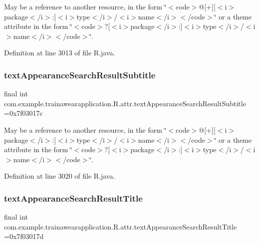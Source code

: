 May be a reference to another resource, in the form \char`\"{}$<$code$>$@\mbox{[}+\mbox{]}\mbox{[}$<$i$>$package$<$/i$>$\+:\mbox{]}$<$i$>$type$<$/i$>$/$<$i$>$name$<$/i$>$$<$/code$>$\char`\"{} or a theme attribute in the form \char`\"{}$<$code$>$?\mbox{[}$<$i$>$package$<$/i$>$\+:\mbox{]}$<$i$>$type$<$/i$>$/$<$i$>$name$<$/i$>$$<$/code$>$\char`\"{}. 

Definition at line 3013 of file R.\+java.

\mbox{\label{classcom_1_1example_1_1trainawearapplication_1_1_r_1_1attr_a7c5f9c532f87a44728789777e362cddf}} 
\subsubsection{\texorpdfstring{textAppearanceSearchResultSubtitle}{textAppearanceSearchResultSubtitle}}
{\footnotesize\ttfamily final int com.\+example.\+trainawearapplication.\+R.\+attr.\+text\+Appearance\+Search\+Result\+Subtitle =0x7f03017c\hspace{0.3cm}{\ttfamily [static]}}

May be a reference to another resource, in the form \char`\"{}$<$code$>$@\mbox{[}+\mbox{]}\mbox{[}$<$i$>$package$<$/i$>$\+:\mbox{]}$<$i$>$type$<$/i$>$/$<$i$>$name$<$/i$>$$<$/code$>$\char`\"{} or a theme attribute in the form \char`\"{}$<$code$>$?\mbox{[}$<$i$>$package$<$/i$>$\+:\mbox{]}$<$i$>$type$<$/i$>$/$<$i$>$name$<$/i$>$$<$/code$>$\char`\"{}. 

Definition at line 3020 of file R.\+java.

\mbox{\label{classcom_1_1example_1_1trainawearapplication_1_1_r_1_1attr_a2c41f110250a5629332dde0437b0fb92}} 
\subsubsection{\texorpdfstring{textAppearanceSearchResultTitle}{textAppearanceSearchResultTitle}}
{\footnotesize\ttfamily final int com.\+example.\+trainawearapplication.\+R.\+attr.\+text\+Appearance\+Search\+Result\+Title =0x7f03017d\hspace{0.3cm}{\ttfamily [static]}}

